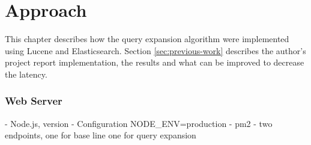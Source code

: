 \chapter{Approach}
\label{ch:approach}
This chapter describes how the query expansion algorithm were implemented using Lucene and Elasticsearch.
Section \ref{sec:previous-work} describes the author's project report \cite{project-report} implementation,
the results and what can be improved to decrease the latency.




\subsection{Web Server}
- Node.js, version
- Configuration NODE\_ENV=production
- pm2
- two endpoints, one for base line one for query expansion
